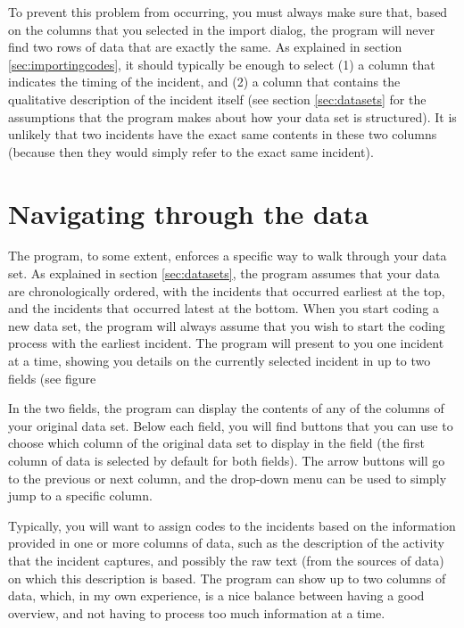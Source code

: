 \documentclass{memoir}
\begin{document}
To prevent this problem from occurring, you must always make sure that, based on the columns that you selected in the import dialog, the program will never find two rows of data that are exactly the same. As explained in section \ref{sec:importingcodes}, it should typically be enough to select (1) a column that indicates the timing of the incident, and (2) a column that contains the qualitative description of the incident itself (see section \ref{sec:datasets} for the assumptions that the program makes about how your data set is structured). It is unlikely that two incidents have the exact same contents in these two columns (because then they would simply refer to the exact same incident).

\section{Navigating through the data}
\label{sec:navigatingdata}

The program, to some extent, enforces a specific way to walk through your data set. As explained in section \ref{sec:datasets}, the program assumes that your data are chronologically ordered, with the incidents that occurred earliest at the top, and the incidents that occurred latest at the bottom. When you start coding a new data set, the program will always assume that you wish to start the coding process with the earliest incident. The program will present to you one incident at a time, showing you details on the currently selected incident in up to two fields (see figure %


In the two fields, the program can display the contents of any of the columns of your original data set. Below each field, you will find buttons that you can use to choose which column of the original data set to display in the field (the first column of data is selected by default for both fields). The arrow buttons will go to the previous or next column, and the drop-down menu can be used to simply jump to a specific column. 

Typically, you will want to assign codes to the incidents based on the information provided in one or more columns of data, such as the description of the activity that the incident captures, and possibly the raw text (from the sources of data) on which this description is based. The program can show up to two columns of data, which, in my own experience, is a nice balance between having a good overview, and not having to process too much information at a time.
\end{document}
